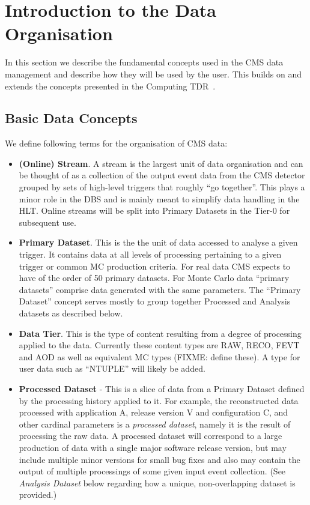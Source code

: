 \documentclass[pdftex]{cmspaper}
\begin{document}
\section{Introduction to the Data Organisation}
  In this section we describe the fundamental concepts used in the CMS
data management and describe how they will be used by the user. This
builds on and extends the concepts presented in the Computing TDR~\cite{CTDR}.

\subsection{Basic Data Concepts}
\label{sec:data}
We define following terms for the organisation of CMS data:

\begin{itemize}
\item {\bf (Online) Stream}. A stream is the largest unit of data organisation
and can be thought of as a collection of the output event data from the CMS
detector grouped by sets of high-level triggers that roughly ``go together''.
This plays a minor role in the DBS and is mainly meant to simplify data 
handling in the HLT. Online streams will be split into Primary Datasets 
in the Tier-0 for subsequent use.

\item {\bf Primary Dataset}. This is the the unit of 
data accessed to analyse a given trigger.  It contains data at all levels of 
processing pertaining to a given trigger or common MC production criteria.
For real data CMS expects to have of the order of 50 primary datasets.  
For Monte Carlo data ``primary datasets'' comprise data generated with the 
same parameters. The ``Primary Dataset'' concept serves mostly to group 
together Processed and Analysis datasets as described below.

\item {\bf Data Tier}. This is the type of content resulting from a 
degree of processing applied to the data. Currently these content types
are RAW, RECO, FEVT and AOD as well as equivalent MC types (FIXME: define 
these). A type for user data such as ``NTUPLE'' will likely be added. 

\item {\bf Processed Dataset} - This is a slice of data from a Primary Dataset
defined by the processing history applied to it.  For example, the 
reconstructed data processed with application A, release version V and 
configuration C, and other cardinal parameters is a {\em processed dataset}, 
namely it is the result of processing the raw data. A processed dataset
will correspond to a large production of data with a single major software
release version, but may include multiple minor versions for small bug
fixes and also may contain the output of multiple processings of some 
given input event collection. (See {\em Analysis Dataset} below regarding
how a unique, non-overlapping dataset is provided.)


\end{itemize}
\end{document}
